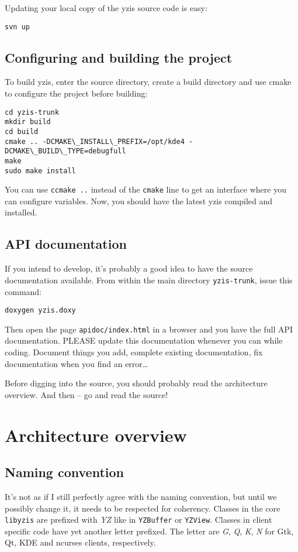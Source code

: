 \documentclass[a4paper,12pt]{report}
\begin{document}
Updating your local copy of the yzis source code is easy:

\begin{verbatim}
svn up
\end{verbatim}

\section{Configuring and building the project}

To build yzis, enter the source directory, create a build directory and use
cmake to configure the project before building:

\begin{verbatim}
cd yzis-trunk
mkdir build
cd build
cmake .. -DCMAKE\_INSTALL\_PREFIX=/opt/kde4 -DCMAKE\_BUILD\_TYPE=debugfull
make
sudo make install
\end{verbatim}

You can use \verb+ccmake ..+ instead of the \verb+cmake+ line to get an
interface where you can configure variables.
Now, you should have the latest yzis compiled and installed.

\section{API documentation}

If you intend to develop, it's probably a good idea to have the source
documentation available. From within the main directory \verb+yzis-trunk+, issue
this command:

\begin{verbatim}
doxygen yzis.doxy
\end{verbatim}

Then open the page \verb+apidoc/index.html+ in a browser and you
have the full API documentation. PLEASE update this documentation whenever you
can while coding. Document things you add, complete existing documentation, fix
documentation when you find an error\ldots{}

Before digging into the source, you should probably read the architecture
overview. And then -- go and read the source!

\chapter{Architecture overview}

\section{Naming convention}
It's not as if I still perfectly agree with the naming convention, but
until we possibly change it, it needs to be respected for coherency.
Classes in the core \verb+libyzis+ are prefixed with \emph{YZ} like in 
\verb+YZBuffer+ or \verb+YZView+.
Classes in client specific code have yet another letter prefixed. The
letter are \emph{G}, \emph{Q}, \emph{K}, \emph{N} for Gtk, Qt, KDE
and ncurses clients, respectively.
\end{document}
